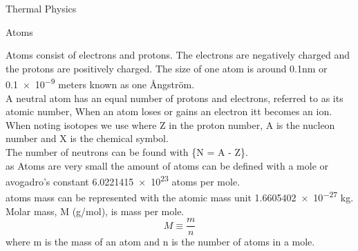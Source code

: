 \documentclass{article}
\newcommand\hr{\par\vspace{-.5\ht\strutbox}\noindent\hrulefill\par}
\begin{document}
\Huge \raggedright Thermal Physics \\ \vspace{1cm}
\begin{large}
    \hr
    \LARGE \center Atoms \\
    \raggedright
    \large Atoms consist of electrons and protons. The electrons are negatively charged and the protons are positively charged. The size of one atom is around 0.1nm or \num{0.1e-9} meters known as one Ångström. \\
    \large A neutral atom has an equal number of protons and electrons, referred to as its atomic number, When an atom loses or gains an electron itt becomes an ion. When noting isotopes we use  where Z in the proton number, A is the nucleon number and X is the chemical symbol. \\ 
    \large The number of neutrons can be found with \{N = A - Z\}. \\ 
    \large as Atoms are very small the amount of atoms can be defined with a mole or avogadro's constant \num{6.0221415e23} atoms per mole. \\
    \large atoms mass can be represented with the atomic mass unit \num{1.6605402e-27} kg. \\
    \large Molar mass, M (g/mol), is mass per mole. \[M \equiv \frac{m}{n}\] where m is the mass of an atom and n is the number of atoms in a mole. \\
    \hr
    

\end{large}
\end{document}
